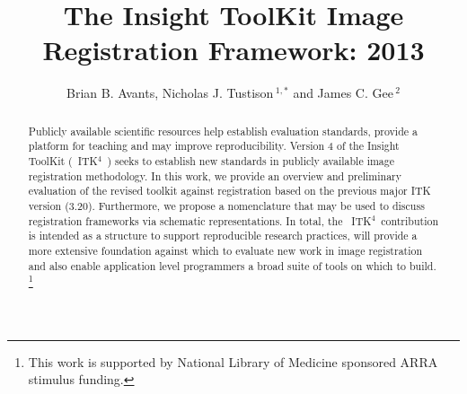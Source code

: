 \documentclass{frontiersSCNS}
\newcommand{\tk}{~ITK$^{\text{4}}$~}
\def\firstAuthorLast{Avants and Gee} %
\def\Authors{Brian B. Avants, Nicholas J. Tustison\,$^{1,*}$ and James C. Gee\,$^{2}$
 }
\begin{document}
\onecolumn
{}

\title[ITKv4 Image Registration]{The Insight ToolKit Image
  Registration Framework: 2013}
\author[\firstAuthorLast ]{\Authors}
\address{}
\correspondance{}
\editor{}
\topic{}

\maketitle

\begin{abstract}
Publicly available scientific resources help establish evaluation
standards, provide a platform for teaching and may improve reproducibility.
Version 4 of the Insight ToolKit (\tk) seeks to establish new
standards in publicly available image registration methodology.  In this
work, we provide an overview and preliminary evaluation of the revised
toolkit against registration based on the previous major ITK version
(3.20).  Furthermore, we propose a nomenclature that may be used to
discuss registration frameworks via schematic representations.  In
total, the \tk contribution is intended as a structure to support
reproducible research practices, will provide a more extensive
foundation against which to evaluate new work in image registration
and also enable application level programmers a broad suite of tools
on which to build. \footnote{This
  work is supported by National Library of Medicine sponsored ARRA
  stimulus funding.}  
\end{abstract}
\end{document}
